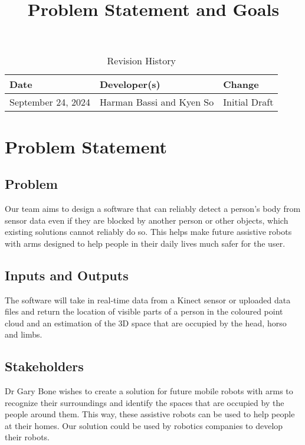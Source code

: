 \documentclass{article}
\title{Problem Statement and Goals\\\progname}
\author{\authname}
\date{}
\begin{document}
\maketitle

\begin{table}[hp]
\caption{Revision History} \label{TblRevisionHistory}
\begin{tabularx}{\textwidth}{llX}
\toprule
\textbf{Date} & \textbf{Developer(s)} & \textbf{Change}\\
\midrule
September 24, 2024 & Harman Bassi and Kyen So & Initial Draft\\
\bottomrule
\end{tabularx}
\end{table}

\newpage

\section{Problem Statement}

\subsection{Problem}
Our team aims to design a software that can reliably detect a person’s body from sensor data even if they are blocked by another person or other objects, which existing solutions cannot reliably do so. This helps make future assistive robots with arms designed to help people in their daily lives much safer for the user.

\subsection{Inputs and Outputs}
The software will take in real-time data from a Kinect sensor or uploaded data files and return the location of visible parts of a person in the coloured point cloud and an estimation of the 3D space that are occupied by the head, horso and limbs.

\subsection{Stakeholders}
Dr Gary Bone wishes to create a solution for future mobile robots with arms to recognize their surroundings and identify the spaces that are occupied by the people around them. This way, these assistive robots can be used to help people at their homes. Our solution could be used by robotics companies to develop their robots.
\end{document}
